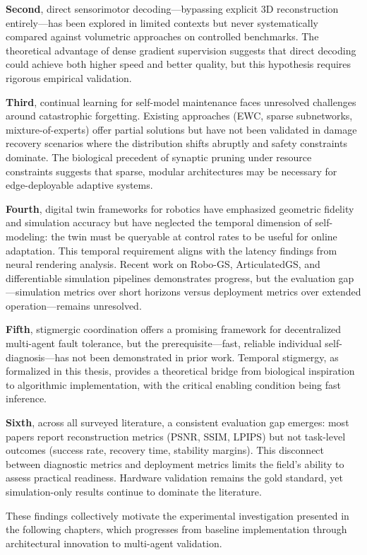 \documentclass[12pt,a4paper,oneside]{report}
\begin{document}
\textbf{Second}, direct sensorimotor decoding—bypassing explicit 3D reconstruction entirely—has been explored in limited contexts but never systematically compared against volumetric approaches on controlled benchmarks. The theoretical advantage of dense gradient supervision suggests that direct decoding could achieve both higher speed and better quality, but this hypothesis requires rigorous empirical validation.

\textbf{Third}, continual learning for self-model maintenance faces unresolved challenges around catastrophic forgetting. Existing approaches (EWC, sparse subnetworks, mixture-of-experts) offer partial solutions but have not been validated in damage recovery scenarios where the distribution shifts abruptly and safety constraints dominate. The biological precedent of synaptic pruning under resource constraints suggests that sparse, modular architectures may be necessary for edge-deployable adaptive systems.

\textbf{Fourth}, digital twin frameworks for robotics have emphasized geometric fidelity and simulation accuracy but have neglected the temporal dimension of self-modeling: the twin must be queryable at control rates to be useful for online adaptation. This temporal requirement aligns with the latency findings from neural rendering analysis. Recent work on Robo-GS, ArticulatedGS, and differentiable simulation pipelines demonstrates progress, but the evaluation gap—simulation metrics over short horizons versus deployment metrics over extended operation—remains unresolved.

\textbf{Fifth}, stigmergic coordination offers a promising framework for decentralized multi-agent fault tolerance, but the prerequisite—fast, reliable individual self-diagnosis—has not been demonstrated in prior work. Temporal stigmergy, as formalized in this thesis, provides a theoretical bridge from biological inspiration to algorithmic implementation, with the critical enabling condition being fast inference.

\textbf{Sixth}, across all surveyed literature, a consistent evaluation gap emerges: most papers report reconstruction metrics (PSNR, SSIM, LPIPS) but not task-level outcomes (success rate, recovery time, stability margins). This disconnect between diagnostic metrics and deployment metrics limits the field's ability to assess practical readiness. Hardware validation remains the gold standard, yet simulation-only results continue to dominate the literature.

These findings collectively motivate the experimental investigation presented in the following chapters, which progresses from baseline implementation through architectural innovation to multi-agent validation.
\end{document}
